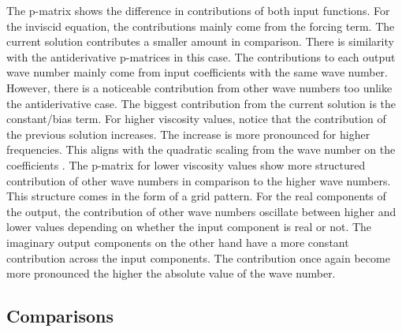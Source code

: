 \documentclass[preprint,12pt,times,authoryear]{elsarticle}
\begin{document}
The p-matrix shows the difference in contributions of both input functions. For the inviscid equation, the contributions mainly come from the forcing term. The current solution contributes a smaller amount in comparison. There is similarity with the antiderivative p-matrices in this case. The contributions to each output wave number mainly come from input coefficients with the same wave number. However, there is a noticeable contribution from other wave numbers too unlike the antiderivative case. The biggest contribution from the current solution is the constant/bias term. For higher viscosity values, notice that the contribution of the previous solution increases. The increase is more pronounced for higher frequencies. This aligns with the quadratic scaling from the wave number on the coefficients \citep{canutoSpectralMethodsEvolution2007}. The p-matrix for lower viscosity values show more structured contribution of other wave numbers in comparison to the higher wave numbers. This structure comes in the form of a grid pattern. For the real components of the output, the contribution of other wave numbers oscillate between higher and lower values depending on whether the input component is real or not. The imaginary output components on the other hand have a more constant contribution across the input components. The contribution once again become more pronounced the higher the absolute value of the wave number.

\subsection{Comparisons}
\end{document}
